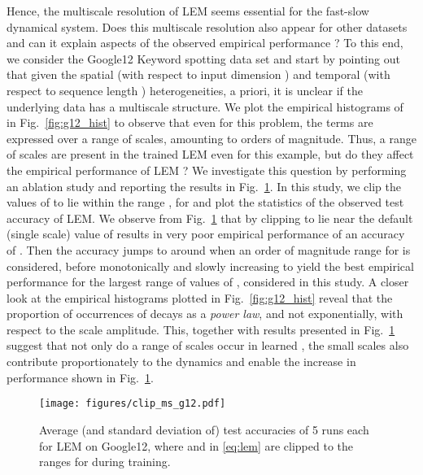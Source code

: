 \documentclass{article} \usepackage{iclr2022_conference,times}
\newcommand{\fref}[1] {Fig.~\ref{#1}}
\begin{document}
Hence, the multiscale resolution of LEM seems essential for the fast-slow dynamical system. Does this multiscale resolution also appear for other datasets and can it explain aspects of the observed empirical performance ? To this end, we consider the Google12 Keyword spotting data set and start by pointing out that given the spatial (with respect to input dimension ) and temporal (with respect to sequence length ) heterogeneities, a priori, it is unclear if the underlying data has a multiscale structure. We plot the empirical histograms of  in \fref{fig:g12_hist} to observe that even for this problem, the terms  are expressed over a range of scales, amounting to  orders of magnitude. Thus, a range of scales are present in the trained LEM even for this example, but do they affect the empirical performance of LEM ? We investigate this question by performing an ablation study and reporting the results in \fref{fig:clip_ms_g12}. In this study, we clip the values of  to lie within the range , for  and plot the statistics of the observed test accuracy of LEM. We observe from \fref{fig:clip_ms_g12} that by clipping   to lie near the default (single scale) value of  results in very poor empirical performance of an accuracy of . Then the accuracy jumps to around  when an order of magnitude range for   is considered, before monotonically and slowly increasing to yield the best empirical performance for the largest range of values of  , considered in this study. A closer look at the empirical histograms plotted in \fref{fig:g12_hist} reveal that the proportion of occurrences of  decays as a \emph{power law}, and not exponentially, with respect to the scale amplitude. This, together with results presented in \fref{fig:clip_ms_g12} suggest that not only do a range of scales occur in learned , the small scales also contribute proportionately to the dynamics and enable the increase in performance shown in \fref{fig:clip_ms_g12}.  
\begin{figure}[ht!]
\centering
\texttt{[image: figures/clip\_ms\_g12.pdf]}
\caption{Average (and standard deviation of) test accuracies of 5 runs each for LEM on Google12, where  and  in \eqref{eq:lem} are clipped to the ranges  for  during training.}
\label{fig:clip_ms_g12}
\end{figure}
\end{document}
